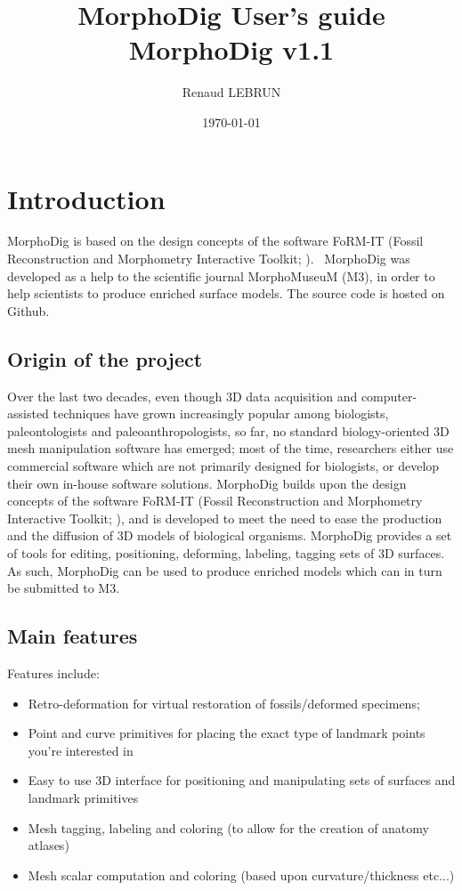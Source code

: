 \documentclass[12pt, a4paper]{book}
\title{MorphoDig User's guide\\MorphoDig v1.1}
\author{Renaud LEBRUN}
\affil{Institut des Sciences de l'Evolution, University of Montpellier, France}
\date{\today}
\begin{document}
	\dominitoc

\maketitle


\tableofcontents

\chapter*{Introduction}


\minitoc 

 MorphoDig is based on the design concepts of the software FoRM-IT (Fossil Reconstruction and Morphometry Interactive Toolkit; \citep{Zollikofer1995,Zollikofer2005}).
\ MorphoDig\citep{Lebrun2018} was developed as a help to the scientific journal MorphoMuseuM (M3), in order to help scientists to produce enriched surface models. The source code is hosted on Github.   
\section*{Origin of the project}
Over the last two decades, even though 3D data acquisition and computer-assisted techniques have grown increasingly popular among biologists, paleontologists and paleoanthropologists, so far, no standard biology-oriented 3D mesh manipulation software has emerged; most of the time, researchers either use commercial software which are not primarily designed for biologists, or develop their own in-house software solutions.  MorphoDig builds upon the design concepts of the software FoRM-IT (Fossil Reconstruction and Morphometry Interactive Toolkit; \citep{Zollikofer1995,Zollikofer2005}), and is developed to meet the need to ease the production and the diffusion of 3D models of biological organisms. MorphoDig provides a set of tools for editing, positioning, deforming, labeling, tagging sets of 3D surfaces. As such, MorphoDig can be used to produce enriched models which can in turn be submitted to M3.
\section*{Main features}
Features include:
\begin{itemize}
\item Retro-deformation for virtual restoration of fossils/deformed specimens;
\item Point and curve primitives for placing the exact type of landmark points you’re interested in
\item Easy to use 3D interface for positioning and manipulating sets of surfaces and landmark primitives
\item Mesh tagging, labeling and coloring (to allow for the creation of anatomy atlases)
\item Mesh scalar computation and coloring (based upon curvature/thickness etc...)
\end{itemize}
\end{document}
